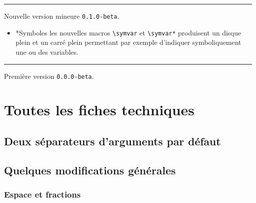 \documentclass[12pt,a4paper]{article}
\makeatletter
\newcommand\env[1]{\texttt{#1}}
\newcommand\macro[1]{\env{\textbackslash{}#1}}
\theoremstyle{definition}
\newcommand\separation{
	\medskip
	\hfill\rule{0.5\textwidth}{0.75pt}\hfill
	\medskip
}
\newcommand\topic{\@ifstar{\@topic@star}{\@topic@no@star}}
\newcommand\@topic@no@star[1]{%
	\textbf{\textsc{#1}.}%
}
\newcommand\@topic@star[1]{%
	\textbf{\textsc{#1} :}%
}
\makeatother
\begin{document}
{{{{{{{{{{{\begin{description}
    \separation


    \medskip
    \item[2020-07-15] Nouvelle version mineure \verb+0.1.0-beta+.
    
    \begin{itemize}[itemsep=.5em]
        \item \topic*{Symboles} les nouvelles macros \macro{symvar} et \macro{symvar*} produisent un disque plein et un carré plein permettant par exemple d'indiquer symboliquement une ou des variables.
    \end{itemize}
    
    \separation


    \medskip
    \item[2020-07-10] Première version \verb+0.0.0-beta+.

\end{description}


\newpage
\section{Toutes les fiches techniques} \label{techincal-ids}















\subsection{Deux séparateurs d'arguments par défaut}









\subsection{Quelques modifications générales}

\subsubsection{Espace et fractions}



}}}}}}}}}}}
\end{document}
